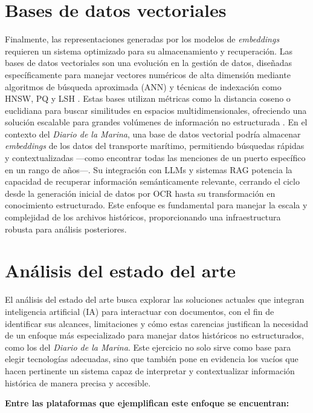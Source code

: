 \section{Bases de datos vectoriales}\label{seq_6}

Finalmente, las representaciones generadas por los modelos de \textit{embeddings} requieren un sistema optimizado para su almacenamiento y recuperación. Las bases de datos vectoriales son una evolución en la gestión de datos, diseñadas específicamente para manejar vectores numéricos de alta dimensión mediante algoritmos de búsqueda aproximada (ANN) y técnicas de indexación como HNSW, PQ y LSH \cite{xie2023brief, han2023comprehensive}. Estas bases utilizan métricas como la distancia coseno o euclidiana para buscar similitudes en espacios multidimensionales, ofreciendo una solución escalable para grandes volúmenes de información no estructurada \cite{azizi2024vector, sun2024soar}.
En el contexto del \textit{Diario de la Marina}, una base de datos vectorial podría almacenar \textit{embeddings} de los datos del transporte marítimo, permitiendo búsquedas rápidas y contextualizadas —como encontrar todas las menciones de un puerto específico en un rango de años—. Su integración con LLMs y sistemas RAG potencia la capacidad de recuperar información semánticamente relevante, cerrando el ciclo desde la generación inicial de datos por OCR hasta su transformación en conocimiento estructurado. Este enfoque es fundamental para manejar la escala y complejidad de los archivos históricos, proporcionando una infraestructura robusta para análisis posteriores.


\section{Análisis del estado del arte}
El análisis del estado del arte busca explorar las soluciones actuales que integran inteligencia artificial (IA) para interactuar con documentos, con el fin de identificar sus alcances, limitaciones y cómo estas carencias justifican la necesidad de un enfoque más especializado para manejar datos históricos no estructurados, como los del \textit{Diario de la Marina}. Este ejercicio no solo sirve como base para elegir tecnologías adecuadas, sino que también pone en evidencia los vacíos que hacen pertinente un sistema capaz de interpretar y contextualizar información histórica de manera precisa y accesible.

\textbf{Entre las plataformas que ejemplifican este enfoque se encuentran:}

